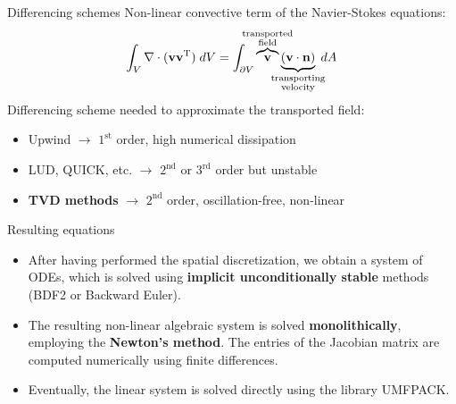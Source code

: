 \documentclass{beamer}
\begin{document}
\begin{frame}{Differencing schemes}
Non-linear convective term of the Navier-Stokes equations:
\begin{equation*}
\int_V \nabla \cdot (\mathbf{v} \mathbf{v}^\mathrm{T}) \; dV = \int_{\partial 
V} 
\overbrace{\mathbf{v}}^{\substack{\text{\makebox[0pt]{transported}} 
		\\ \text{\makebox[0pt]{field}}}} \underbrace{(\mathbf{v} \cdot 
	\mathbf{n})}_{\substack{\text{\makebox[0pt]{transporting}} \\
		\text{\makebox[0pt]{velocity}}}} \; dA
\end{equation*}
Differencing scheme needed to approximate the transported field:
\begin{itemize}
	\item Upwind $\rightarrow$ $1^\text{st}$ order, high numerical dissipation
	\item LUD, QUICK, etc. $\rightarrow$ $2^\text{nd}$ or $3^\text{rd}$ order 
	but unstable
	\item \textbf{TVD methods} $\rightarrow$ $2^\text{nd}$ order, 
	oscillation-free, 
	non-linear
\end{itemize}
\end{frame}
\begin{frame}{Resulting equations}
\begin{itemize}
\item After having performed the spatial discretization, we obtain a system of 
ODEs, which is solved using \textbf{implicit unconditionally stable} methods 
(BDF2 or Backward Euler).

\item The resulting non-linear algebraic system is solved 
\textbf{monolithically}, 
employing the \textbf{Newton's method}. The entries of the Jacobian matrix are 
computed 
numerically using finite differences.

\item Eventually, the linear system is solved directly using the library 
UMFPACK.
\end{itemize}
\end{frame}
\end{document}
